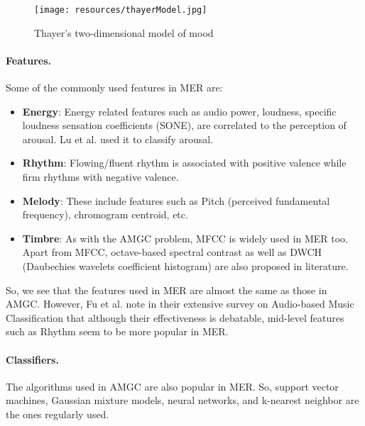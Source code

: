 \begin{figure}[hlvt!]
        \centering
        \texttt{[image: resources/thayerModel.jpg]}
        \caption{Thayer's two-dimensional model of mood}
        \label{fig:figure3}
\end{figure}

\paragraph{Features.}

Some of the commonly used features in MER are:

\begin{itemize}
    \item \textbf{Energy}: Energy related features such as audio power, loudness, specific loudness sensation coefficients (SONE), are correlated to the perception of arousal. 
        Lu et al. \cite{Lu2006} used it to classify arousal.

    \item \textbf{Rhythm}: Flowing/fluent rhythm is associated with positive valence while firm rhythms with negative valence.

    \item \textbf{Melody}: These include features such as Pitch (perceived fundamental frequency), chromogram centroid, etc.

    \item \textbf{Timbre}: As with the AMGC problem, MFCC is widely used in MER too. Apart from MFCC, octave-based spectral contrast as well as DWCH (Daubechies wavelets coefficient histogram) are also proposed in literature.
        
\end{itemize}

So, we see that the features used in MER are almost the same as those in AMGC. However, Fu et al. note in their extensive survey on Audio-based Music Classification \cite{Fu2011} that although their effectiveness is debatable, mid-level features such as Rhythm seem to be more popular in MER.


\paragraph{Classifiers.}

The algorithms used in AMGC are also popular in MER. So, support vector machines, Gaussian mixture models, neural networks, and k-nearest neighbor are the ones regularly used.

